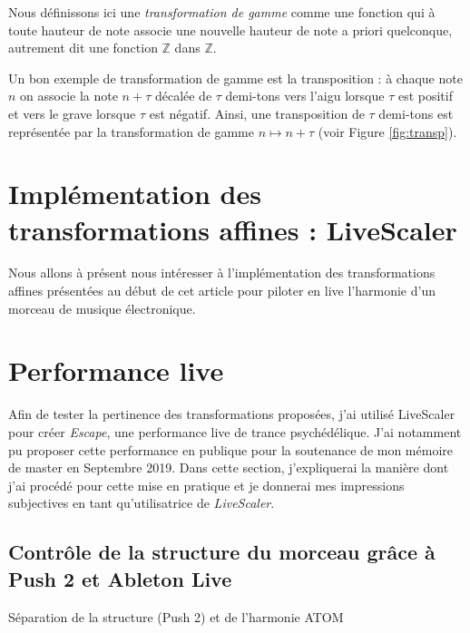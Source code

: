 \documentclass[french,11pt]{article}
\begin{document}
Nous définissons ici une \emph{transformation de gamme} comme une fonction qui à toute hauteur de note associe une nouvelle hauteur de note a priori quelconque, autrement dit une fonction $\mathbb{Z}$ dans $\mathbb{Z}$.

Un bon exemple de transformation de gamme est la transposition : à chaque note $n$ on associe la note $n+\tau$  décalée de $\tau$ demi-tons vers l'aigu lorsque $\tau$ est positif et vers le grave lorsque $\tau$ est négatif. Ainsi, une transposition de $\tau$ demi-tons est représentée par la transformation de gamme $ n \mapsto n+\tau$ (voir Figure \ref{fig:transp}).










\section{Implémentation des transformations affines : LiveScaler}
Nous allons à présent nous intéresser à l'implémentation des transformations affines présentées au début de cet article pour piloter en live l'harmonie d'un morceau de musique électronique. 









\section{Performance live }
Afin de tester la pertinence des transformations proposées, j'ai utilisé LiveScaler pour créer \emph{Escape}, une performance live de trance psychédélique. J'ai notamment pu proposer cette performance en publique pour la soutenance de mon mémoire de master en Septembre 2019. Dans cette section, j'expliquerai la manière dont j'ai procédé pour cette mise en pratique et je donnerai mes impressions subjectives en tant qu'utilisatrice de \emph{LiveScaler}.



\subsection{Contrôle de la structure du morceau grâce à Push 2 et Ableton Live}
Séparation de la structure (Push 2) et de l'harmonie ATOM
\end{document}
